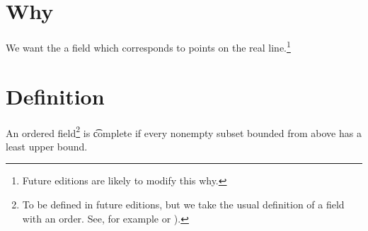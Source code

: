 
\section*{Why}

We want the a field which corresponds to points on the real line.\footnote{Future editions are likely to modify this why.}

\section*{Definition}

An ordered field\footnote{To be defined in future editions, but we take the usual definition of a field with an order. See, for example or ).}
is \t{complete} if every nonempty subset bounded from above has a least upper bound.

\blankpage